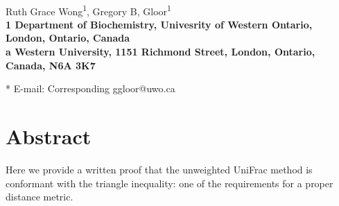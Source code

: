 \documentclass[10pt,letterpaper]{article}
\date{}
\begin{document}
\vspace*{0.35in}

\begin{flushleft}
{\Large
\textbf{}
}
\newline
\\
Ruth Grace Wong\textsuperscript{1},
Gregory B, Gloor\textsuperscript{1}
\\
\bf{1} Department of Biochemistry, Univesrity of Western Ontario, London, Ontario, Canada
\\

% 
%


\textcurrency a Western University, 1151 Richmond Street, London, Ontario, Canada, N6A 3K7



* E-mail: Corresponding ggloor@uwo.ca
\end{flushleft}
\section*{Abstract}
Here we provide a written proof that the unweighted UniFrac method is conformant with the triangle inequality: one of the requirements for a proper distance metric.

\end{document}
